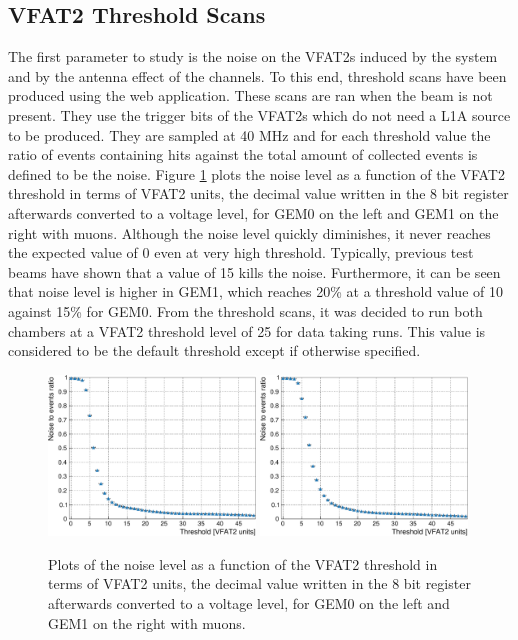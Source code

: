     \subsection{VFAT2 Threshold Scans}

      The first parameter to study is the noise on the VFAT2s induced by the system and by the antenna effect of the channels. To this end, threshold scans have been produced using the web application. These scans are ran when the beam is not present. They use the trigger bits of the VFAT2s which do not need a L1A source to be produced. They are sampled at 40 MHz and for each threshold value the ratio of events containing hits against the total amount of collected events is defined to be the noise. Figure \ref{fig:II-3-data-threshold} plots the noise level as a function of the VFAT2 threshold in terms of VFAT2 units, the decimal value written in the 8 bit register afterwards converted to a voltage level, for GEM0 on the left and GEM1 on the right with muons. Although the noise level quickly diminishes, it never reaches the expected value of 0 even at very high threshold. Typically, previous test beams have shown that a value of 15 kills the noise. Furthermore, it can be seen that noise level is higher in GEM1, which reaches 20\% at a threshold value of 10 against 15\% for GEM0. From the threshold scans, it was decided to run both chambers at a VFAT2 threshold level of 25 for data taking runs. This value is considered to be the default threshold except if otherwise specified. \\

      \begin{figure}[h!]
        \centering
        \includegraphics[width=0.49\textwidth]{img/plots/cThresholdScan_GEM0-crop}
        \includegraphics[width=0.49\textwidth]{img/plots/cThresholdScan_GEM1-crop}
        \caption{Plots of the noise level as a function of the VFAT2 threshold in terms of VFAT2 units, the decimal value written in the 8 bit register afterwards converted to a voltage level, for GEM0 on the left and GEM1 on the right with muons.}
        \label{fig:II-3-data-threshold}
      \end{figure}

